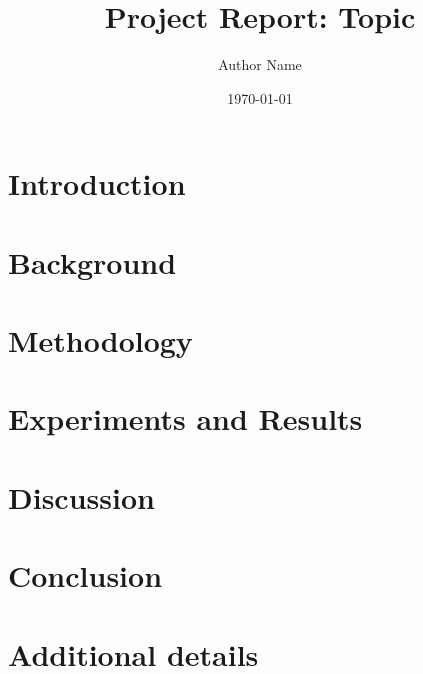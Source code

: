 \documentclass[11pt,a4paper]{report}
\title{Project Report: Topic}
\author{Author Name}
\date{\today}
\begin{document}
\maketitle
\tableofcontents

\chapter{Introduction}


\chapter{Background}


\chapter{Methodology}


\chapter{Experiments and Results}


\chapter{Discussion}


\chapter{Conclusion}


\printbibliography

\appendix
\chapter{Additional details}

\end{document}
